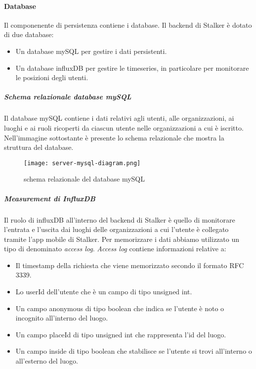 \documentclass[../../manuale-manutentore.tex]{subfiles}
\begin{document}
\paragraph{Database}%
\label{par:database}

Il componenente di persistenza contiene i database. Il backend di Stalker è dotato di due database:
\begin{itemize}
  \item Un database mySQL per gestire i dati persistenti.
  \item Un database influxDB per gestire le timeseries, in particolare per monitorare le posizioni degli utenti.
\end{itemize}

\subparagraph{Schema relazionale database mySQL}%
\label{subp:schema_relazionale_database_mysql}
Il database mySQL contiene i dati relativi agli utenti, alle organizzazioni, ai luoghi e ai ruoli ricoperti da ciascun utente nelle organizzazioni a cui è iscritto.
Nell'immagine sottostante è presente lo schema relazionale che mostra la struttura del database.
\begin{figure}[H]
  \centering
  \texttt{[image: server-mysql-diagram.png]}
  \caption{schema relazionale del database mySQL}%
   \label{fig: schema relazionale del database mySQL}
\end{figure}


\subparagraph{Measurement di InfluxDB}%
\label{subp:measurement_di_influxDB}

Il ruolo di influxDB all'interno del backend di Stalker è quello di monitorare l'entrata e l'uscita dai luoghi delle organizzazioni a cui l'utente è collegato tramite l'app mobile di Stalker.
Per memorizzare i dati abbiamo utilizzato un tipo di  denominato \textit{access log}. \textit{Access log}  contiene informazioni relative a:
\begin{itemize}
  \item Il timestamp della richiesta che viene memorizzato secondo il formato RFC 3339.
  \item Lo userId dell'utente che è un campo di tipo unsigned int.
  \item Un campo anonymous di tipo boolean che indica se l'utente è noto o incognito all'interno del luogo.
  \item Un campo placeId di tipo unsigned int che rappresenta l'id del luogo.
  \item Un campo inside di tipo boolean che stabilisce se l'utente si trovi all'interno o all'esterno del luogo.
\end{itemize}
\end{document}
